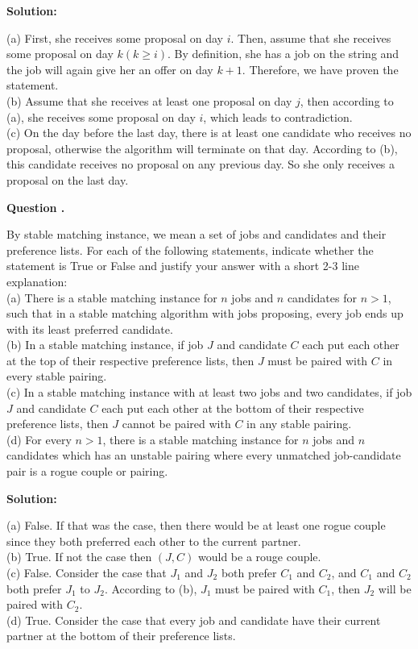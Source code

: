 \documentclass[12pt]{article}
\newcounter{questionnumber}
\newenvironment{question}[1][]{\stepcounter{questionnumber}\par\noindent\textbf{Question \thequestionnumber. #1}\par}{\par}
\newenvironment{solution}{\par\noindent\textbf{Solution:}\par}{\par\vspace{1em}}
\begin{document}
\begin{solution}
    \noindent
    (a) First, she receives some proposal on day $i$. Then, assume that she receives some proposal on day $k(k\geq i)$. By definition, she has a job on the string and the job will again give her an offer on day $k+1$. Therefore, we have proven the statement.\\
    (b) Assume that she receives at least one proposal on day $j$, then according to (a), she receives some proposal on day $i$, which leads to contradiction.\\
    (c) On the day before the last day, there is at least one candidate who receives no proposal, otherwise the algorithm will terminate on that day.
    According to (b), this candidate receives no proposal on any previous day. So she only receives a proposal on the last day.
\end{solution}
\begin{question}
    \noindent
    By stable matching instance, we mean a set of jobs and candidates and their preference lists. For each of the following statements, indicate whether the statement is True or False and justify your answer with a short 2-3 line explanation:\\
    (a) There is a stable matching instance for $n$ jobs and $n$ candidates for $n > 1$, such that in a stable matching algorithm with jobs proposing, every job ends up with its least preferred candidate.\\
    (b) In a stable matching instance, if job $J$ and candidate $C$ each put each other at the top of their respective preference lists, then $J$ must be paired with $C$ in every stable pairing.\\
    (c) In a stable matching instance with at least two jobs and two candidates, if job $J$ and candidate $C$ each put each other at the bottom of their respective preference lists, then $J$ cannot be paired with $C$ in any stable pairing.\\
    (d) For every $n > 1$, there is a stable matching instance for $n$ jobs and $n$ candidates which has an unstable pairing where every unmatched job-candidate pair is a rogue couple or pairing.
\end{question}
\begin{solution}
    \noindent
    (a) False. If that was the case, then there would be at least one rogue couple since they both preferred each other to the current partner.\\
    (b) True. If not the case then $(J,C)$ would be a rouge couple.\\
    (c) False. Consider the case that $J_1$ and $J_2$ both prefer $C_1$ and $C_2$, and $C_1$ and $C_2$ both prefer $J_1$ to $J_2$. According to (b), $J_1$ must be paired with $C_1$, then $J_2$ will be paired with $C_2$.\\
    (d) True. Consider the case that every job and candidate have their current partner at the bottom of their preference lists.
\end{solution}
\end{document}

